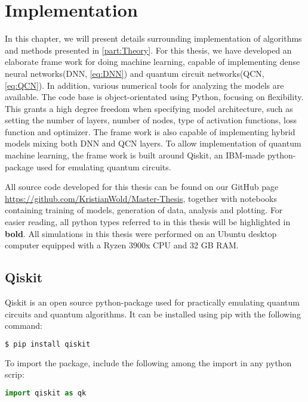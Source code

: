 \chapter{Implementation}\label{chap:implementation}
In this chapter, we will present details surrounding implementation of algorithms and methods presented in \autoref{part:Theory}. For this thesis, we have developed an elaborate frame work for doing machine learning, capable of implementing dense neural networks(DNN, \autoref{eq:DNN}) and quantum circuit networks(QCN, \autoref{eq:QCN}). In addition, various numerical tools for analyzing the models are available. The code base is object-orientated using Python, focusing on flexibility. This grants a high degree freedom when specifying model architecture, such as setting the number of layers, number of nodes, type of activation functions, loss function and optimizer. The frame work is also capable of implementing hybrid models mixing both DNN and QCN layers. To allow implementation of quantum machine learning, the frame work is built around Qiskit\cite{Qiskit}, an IBM-made python-package used for emulating quantum circuits. 

All source code developed for this thesis can be found on our GitHub page \url{https://github.com/KristianWold/Master-Thesis}, together with notebooks containing training of models, generation of data, analysis and plotting. For easier reading, all python types referred to in this thesis will be highlighted in \textbf{bold}. All simulations in this thesis were performed on an Ubuntu desktop computer equipped with a Ryzen 3900x CPU and 32 GB RAM.

\section{Qiskit}\label{sec:Qiskit}

Qiskit\cite{Qiskit} is an open source python-package used for practically emulating quantum circuits and quantum algorithms. It can be installed using pip with the following command:

\begin{lstlisting}[language=bash]
  $ pip install qiskit
\end{lstlisting}
To import the package, include the following among the import in any python scrip:
\begin{lstlisting}[language=python]
  import qiskit as qk
\end{lstlisting}

